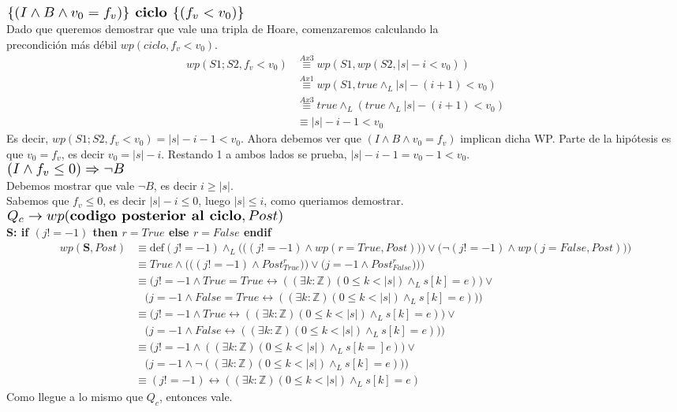 \documentclass[a4paper]{article}
\begin{document}
	$\scalebox{1.3}{$\{(I\wedge B\wedge v_0=f_v)\}\textbf{ ciclo }\{(f_v<v_0)\}$}$\medskip \\
	Dado que queremos demostrar que vale una tripla de Hoare, comenzaremos calculando la\\ precondición más débil $wp(ciclo,f_v<v_0)$.
	\begin{align*}
		wp(S1;S2,f_v<v_0)&\stackrel{Ax3}{\equiv}wp(S1,wp(S2,|s|-i<v_0))\\
			&\stackrel{Ax1}{\equiv}wp(S1,true\wedge_L |s|-(i+1)<v_0)\\
			&\stackrel{Ax3}{\equiv}true\wedge_L(true\wedge_L  |s|-(i+1)<v_0)\\
			&\equiv |s|-i-1<v_0
	\end{align*}
	Es decir, $wp(S1;S2,f_v<v_0)=|s|-i-1<v_0$. Ahora debemos ver que $(I\wedge B\wedge v_0=f_v)$ implican dicha WP. Parte de la 
	hipótesis es que $v_0=f_v$, es decir $v_0=|s|-i$. Restando 1 a ambos lados se prueba, $|s|-i-1=v_0-1<v_0$.\medskip \\
	$\scalebox{1.3}{$(I\wedge f_v\leq 0)\Rightarrow \neg B$}$\medskip\\
	Debemos mostrar que vale $\neg B$, es decir $i\geq |s|$.\\
	Sabemos que $f_v\leq 0$, es decir $|s|-i\leq 0$, luego $|s|\leq i$, como queriamos demostrar.\medskip\\
	\noindent
$\scalebox{1.3}{$Q_c \rightarrow wp(\textbf{codigo posterior al ciclo},Post)$}$\medskip \\
\textbf{S: if $(j != -1)$ then $r=True$ else $r=False$ endif}\\
\begin{align*}
   			wp(\textbf{S},Post)&\equiv \textrm{def}(j != -1)\wedge_L 
   				\Bigg(\Big((j!=-1)\wedge wp(r=True,Post))\Big) \vee\Big(\neg (j!=-1)\wedge wp(j=False,Post)\Big)\Bigg)\\
   					&\equiv True \wedge \Bigg(\Big((j!=-1)\wedge Post_{True}^{r})\Big) 
   						\vee\Big(j=-1\wedge Post_{False}^{r})\Big)\Bigg)\\ 
   				&\equiv \Big(j!=-1\wedge True=True \leftrightarrow ((\exists k:\mathbb{Z})(0\leq k<|s|)\wedge_L s[k]=e)\Big) \vee\\
   						&\ \ \ \ \Big(j=-1\wedge False=True \leftrightarrow ((\exists k:\mathbb{Z})(0\leq k<|s|)\wedge_L s[k]=e))\Big)\\ 
   				&\equiv \Big(j!=-1\wedge True \leftrightarrow ((\exists k:\mathbb{Z})(0\leq k<|s|)\wedge_L s[k]=e)\Big) \vee\\
   						&\ \ \ \ \Big(j=-1\wedge False \leftrightarrow ((\exists k:\mathbb{Z})(0\leq k<|s|)\wedge_L s[k]=e))\Big)\\   
   				&\equiv \Big(j!=-1\wedge ((\exists k:\mathbb{Z})(0\leq k<|s|)\wedge_L s[k=]e)\Big) \vee\\
   						&\ \ \ \ \Big(j=-1\wedge \neg((\exists k:\mathbb{Z})(0\leq k<|s|)\wedge_L s[k]=e))\Big)\\    	
   				&\equiv (j!=-1)\leftrightarrow ((\exists k:\mathbb{Z})(0\leq k<|s|)\wedge_L s[k]=e)  						   				  		
   		\end{align*}
Como llegue  a lo mismo que $Q_c$, entonces vale.
\end{document}
